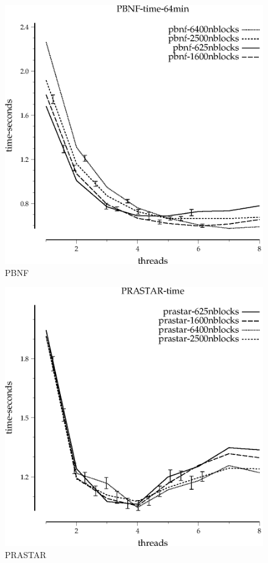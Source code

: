 \documentclass{article}
\begin{document}
\begin{figure}
\begin{center}
\includegraphics{PBNF-time-64min}
\end{center}
\caption{PBNF}
\end{figure}

\begin{figure}
\begin{center}
\includegraphics{PRASTAR-time}
\end{center}
\caption{PRASTAR}
\end{figure}
\end{document}
